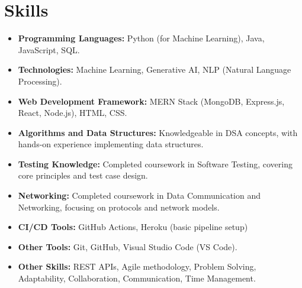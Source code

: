 \documentclass[letterpaper,9pt]{article}
\newcommand{\resumeItem}[1]{\item\small{#1}}
\begin{document}
\section*{Skills}
\begin{itemize}
  \resumeItem{\textbf{Programming Languages:} Python (for Machine Learning), Java, JavaScript, SQL.}
  \resumeItem{\textbf{Technologies:} Machine Learning, Generative AI, NLP (Natural Language Processing).}
  \resumeItem{\textbf{Web Development Framework:} MERN Stack (MongoDB, Express.js, React, Node.js), HTML, CSS.}
  \resumeItem{\textbf{Algorithms and Data Structures:} Knowledgeable in DSA concepts, with hands-on experience implementing data structures.}
  \resumeItem{\textbf{Testing Knowledge:} Completed coursework in Software Testing, covering core principles and test case design.}
  \resumeItem{\textbf{Networking:} Completed coursework in Data Communication and Networking, focusing on protocols and network models.}
  \resumeItem{\textbf{CI/CD Tools:} GitHub Actions, Heroku (basic pipeline setup)}
  \resumeItem{\textbf{Other Tools:} Git, GitHub, Visual 
  Studio Code (VS Code).}
  \resumeItem{\textbf{Other Skills:} REST APIs, Agile methodology, Problem Solving, Adaptability, Collaboration, Communication, Time Management.}


\end{itemize}

\end{document}
